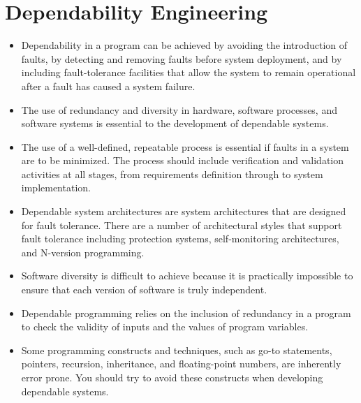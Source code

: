 \documentclass{article}
\begin{document}
\section{Dependability Engineering}
\begin{itemize}
    \item Dependability in a program can be achieved by avoiding the introduction of faults, by detecting and removing faults before system deployment, and by including fault-tolerance facilities that allow the system to remain operational after a fault has caused a system failure.
    \item The use of redundancy and diversity in hardware, software processes, and software systems is essential to the development of dependable systems.
    \item The use of a well-defined, repeatable process is essential if faults in a system are to be minimized.  
        The process should include verification and validation activities at all stages, from requirements definition through to system implementation.
    \item Dependable system architectures are system architectures that are designed for fault tolerance.
        There are a number of architectural styles that support fault tolerance including protection systems, self-monitoring architectures, and N-version programming.
    \item Software diversity is difficult to achieve because it is practically impossible to ensure that each version of software is truly independent.
    \item Dependable programming relies on the inclusion of redundancy in a program to check the validity of inputs and the values of program variables.
    \item Some programming constructs and techniques, such as go-to statements, pointers, recursion, inheritance, and floating-point numbers, are inherently error prone.
        You should try to avoid these constructs when developing dependable systems.
\end{itemize}
\end{document}
